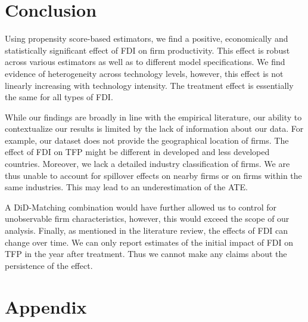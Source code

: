 \documentclass[a4paper,11pt]{scrartcl}
\begin{document}
\section{Conclusion}

Using propensity score-based estimators, we find a positive, economically and statistically significant effect of FDI on firm productivity. This effect is robust across various estimators as well as to different model specifications. We find evidence of heterogeneity across technology levels, however, this effect is not linearly increasing with technology intensity. 
The treatment effect is essentially the same for all types of FDI. 

While our findings are broadly in line with the empirical literature, our ability to contextualize our results is limited by the lack of information about our data. For example, our dataset does not provide the geographical location of firms. The effect of FDI on TFP might be different in developed and less developed countries. 
Moreover, we lack a detailed industry classification of firms. We are thus unable to account for spillover effects on nearby firms or on firms within the same industries. This may lead to an underestimation of the ATE.

A DiD-Matching combination would have further allowed us to control for 
unobservable firm characteristics, however, this would exceed the scope of our analysis. Finally, as mentioned in the literature review, the effects of FDI can change over time. 
We can only report estimates of the initial impact of FDI on TFP in the year after treatment. Thus we cannot make any claims about the persistence of the effect.  

\newpage

 
\newpage


\setcounter{page}{3} %

\appendix
\section{Appendix} 
\setcounter{table}{0}
\end{document}
